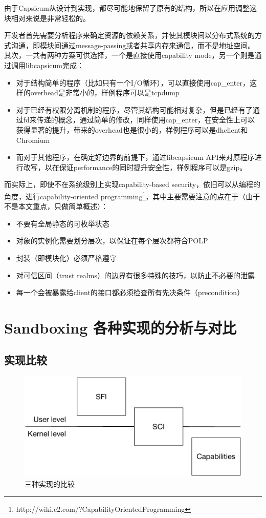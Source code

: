\documentclass[final,5p,times]{elsarticle}
\begin{document}
由于Capsicum从设计到实现，都尽可能地保留了原有的结构，所以在应用调整这块相对来说是非常轻松的。

开发者首先需要分析程序来确定资源的依赖关系，并使其模块间以分布式系统的方式沟通，即模块间通过message-passing或者共享内存来通信，而不是地址空间。其次，一共有两种方案可供选择，一个是直接使用capability mode，另一个则是通过调用libcapsicum完成：
\begin{itemize}
	\item
	对于结构简单的程序（比如只有一个I/O循环），可以直接使用cap\_enter，这样的overhead是非常小的，样例程序可以是tcpdump
	\item
	对于已经有权限分离机制的程序，尽管其结构可能相对复杂，但是已经有了通过fd来传递的概念，通过简单的修改，同样使用cap\_enter，在安全性上可以获得显著的提升，带来的overhead也是很小的，样例程序可以是dhclient和Chromium
	\item
	而对于其他程序，在确定好边界的前提下，通过libcapsicum API来对原程序进行改写，以在保证performance的同时提升安全性，样例程序可以是gzip。
\end{itemize}

而实际上，即使不在系统级别上实现capability-based security，依旧可以从编程的角度，进行capability-oriented programming\footnote{http://wiki.c2.com/?CapabilityOrientedProgramming}，其中主要需要注意的点在于（由于不是本文重点，只做简单概述）：
\begin{itemize}
	\item
	不要有全局静态的可枚举状态
	\item
	对象的实例化需要划分层次，以保证在每个层次都符合POLP
	\item
	封装（即模块化）必须严格遵守
	\item
	对可信区间（trust realms）的边界有很多特殊的技巧，以防止不必要的泄露
	\item
	每一个会被暴露给client的接口都必须检查所有先决条件（precondition）
\end{itemize}

\section{Sandboxing 各种实现的分析与对比}
\label{s:evaluation}

\subsection{实现比较}
\label{ss: comparision}

\begin{figure}
\centering
\includegraphics[width=0.7\linewidth]{imgs/difference}
\caption{三种实现的比较}
\label{fig:difference}
\end{figure}
\end{document}
